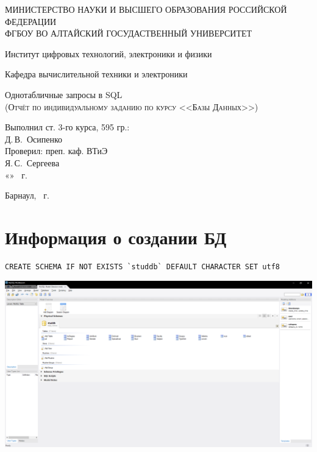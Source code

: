 \documentclass[a4paper, 12pt]{article}
\begin{document}
\begin{titlepage}
  \begin{center}
    \MakeUppercase{Министерство науки и высшего образования Российской Федерации} \\
    \MakeUppercase{ФГБОУ ВО Алтайский госудаственный университет}
    \vspace{0.25cm}
    
	  Институт цифровых технологий, электроники и физики
    
    Кафедра вычислительной техники и электроники
    \vfill
    
    {\LARGE Однотабличные запросы в SQL}\\[5mm]
    \textsc{(Отчёт по индивидуальному заданию по курсу <<Базы Данных>>)}
  \bigskip

\end{center}
\vfill

\newlength{\ML}
\hfill
\begin{minipage}{0.45\textwidth}
  Выполнил ст. 3-го курса, 595 гр.:\\
  \underline{\hspace{\ML}} Д.\,В.~Осипенко\\
  Проверил: преп. каф. ВТиЭ\\
  \underline{\hspace{\ML}} Я.\,С.~Сергеева\\
  «\underline{\hspace{0.7cm}}» \underline{\hspace{2cm}} \the\year~г.
\end{minipage}%
\vfill

\begin{center}
  Барнаул, \the\year~г.
\end{center}
\end{titlepage}
\tableofcontents
\newpage

\section{Информация о создании БД}
\begin{lstlisting}
CREATE SCHEMA IF NOT EXISTS `studdb` DEFAULT CHARACTER SET utf8 
\end{lstlisting}
\includegraphics[width=\textwidth]{1.png}
\end{document}
